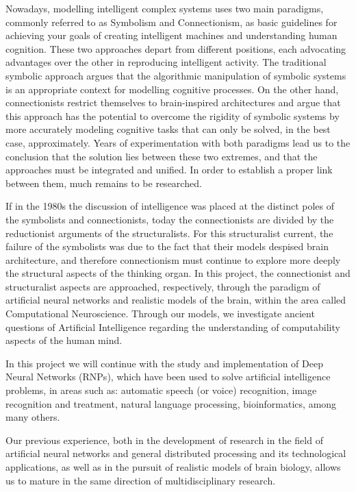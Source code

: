 Nowadays, modelling intelligent complex systems uses two main paradigms, commonly referred to as Symbolism and Connectionism, as basic guidelines for achieving your goals of creating intelligent machines and understanding human cognition. 
These two approaches depart from different positions, each advocating advantages over the other in reproducing intelligent activity. 
The traditional symbolic approach argues that the algorithmic manipulation of symbolic systems is an appropriate context for modelling cognitive processes. 
On the other hand, connectionists restrict themselves to brain-inspired architectures and argue that this approach has the potential to overcome the rigidity of symbolic systems by more accurately modeling cognitive tasks that can only be solved, in the best case, approximately. 
Years of experimentation with both paradigms lead us to the conclusion that the solution lies between these two extremes, and that the approaches must be integrated and unified. 
In order to establish a proper link between them, much remains to be researched.

If in the 1980s the discussion of intelligence was placed at the distinct poles
of the symbolists and connectionists, today the connectionists are divided by the
reductionist arguments of the structuralists. 
For this structuralist current, the failure of the symbolists was due to the fact that their models despised brain architecture,
and therefore connectionism must continue to explore more deeply the structural aspects
of the thinking organ. 
In this project, the connectionist and structuralist aspects are approached, respectively, through the paradigm of artificial neural networks and realistic models of the brain, within the area called Computational Neuroscience. 
Through our models, we investigate ancient questions of Artificial Intelligence regarding the understanding of computability aspects of the human mind.

In this project we will continue with the study and implementation of Deep Neural Networks (RNPs), which have been used to solve artificial intelligence problems, in areas such as: automatic speech (or voice) recognition, image recognition and treatment, natural language processing, bioinformatics, among many others.

Our previous experience, both in the development of research in the field of artificial neural networks and general distributed processing and its technological applications, as well as in the pursuit of realistic models of brain biology, allows us to mature in the same direction of multidisciplinary research.
